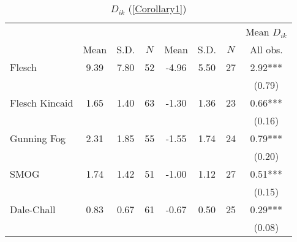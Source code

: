 \begin{table}
    \footnotesize
    \centering
    \begin{threeparttable}
        \caption{\(D_{ik}\) (\autoref{Corollary1})}
        \label{table8_base}
        \begin{tabular}{p{3cm}S[table-format=3.3]@{}S[table-format=3.3]@{}S[table-format=3.2]@{}S[table-format=4.3]@{}S[table-format=3.3]@{}S[table-format=3.1]@{}S@{}}
            \toprule
            &&&{{Mean \(D_{ik}\)}}\\\cmidrule(lr){2-4}\cmidrule(lr){5-7}\cmidrule(lr){8-8}&{{Mean}}&{{S.D.}}&{{\(N\)}}&{{Mean}}&{{S.D.}}&{{\(N\)}}&{{All obs.}}\\
            \midrule
            Flesch                        &        9.39&        7.80&          52&       -4.96&        5.50&          27&        2.92***\\
                                          &            &            &            &            &            &            &      (0.79)   \\
            Flesch Kincaid                &        1.65&        1.40&          63&       -1.30&        1.36&          23&        0.66***\\
                                          &            &            &            &            &            &            &      (0.16)   \\
            Gunning Fog                   &        2.31&        1.85&          55&       -1.55&        1.74&          24&        0.79***\\
                                          &            &            &            &            &            &            &      (0.20)   \\
            SMOG                          &        1.74&        1.42&          51&       -1.00&        1.12&          27&        0.51***\\
                                          &            &            &            &            &            &            &      (0.15)   \\
            Dale-Chall                    &        0.83&        0.67&          61&       -0.67&        0.50&          25&        0.29***\\
                                          &            &            &            &            &            &            &      (0.08)   \\

\end{tabular}
\end{threeparttable}
\end{table}
